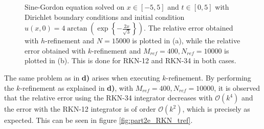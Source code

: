 \begin{figure}
\centering
{}\hspace{0mm}
\hspace{0mm}
\caption{Sine-Gordon equation solved on $x \in [-5,5]$ and $t \in [0,5]$ with Dirichlet boundary conditions and initial condition $u(x,0)=4\arctan{\left( \exp{\left\{-\frac{2x}{\sqrt{3}}\right\}} \right)}$. The relative error obtained with $h$-refinement and $N=15000$ is plotted in (a), while the relative error obtained with $k$-refinement and $M_{ref}=400, N_{ref}=10000$ is plotted in (b). This is done for RKN-12 and RKN-34 in both cases.}
\end{figure}

The same problem as in \textbf{d)} arises when executing $k$-refinement. By performing the $k$-refinement as explained in \textbf{d)}, with $M_{ref}=400, N_{ref}=10000$, it is observed that the relative error using the RKN-34 integrator decreases with $\mathcal{O}(k^4)$ and the error with the RKN-12 integrator is of order $\mathcal{O}(k^2)$, which is precisely as expected. This can be seen in figure \ref{fig:part2e_RKN_tref}. 

